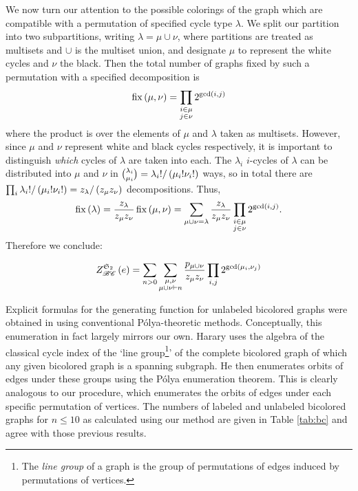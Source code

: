 \documentclass[sectionflow,singlespace,twoside,boldmathhdr,draft]{brandiss} %
\numberwithin{section}{chapter}
\numberwithin{figure}{chapter}
\begin{document}
We now turn our attention to the possible colorings of the graph which are compatible with a permutation of specified cycle type $\lambda$.
We split our partition into two subpartitions, writing $\lambda = \mu \cup \nu$, where partitions are treated as multisets and $\cup$ is the multiset union, and designate $\mu$ to represent the white cycles and $\nu$ the black.
Then the total number of graphs fixed by such a permutation with a specified decomposition is
\begin{equation*}
  \operatorname{fix} \left( {\mu, \nu} \right) = \prod_{\substack{i \in \mu \\ j \in \nu}} 2^{\gcd \left( {i, j} \right)}
\end{equation*}
where the product is over the elements of $\mu$ and $\lambda$ taken as multisets.
However, since $\mu$ and $\nu$ represent white and black cycles respectively, it is important to distinguish \emph{which} cycles of $\lambda$ are taken into each.
The $\lambda_{i}$ $i$-cycles of $\lambda$ can be distributed into $\mu$ and $\nu$ in $\binom{\lambda_{i}}{\mu_{i}} = \lambda_{i}! / \left( {\mu_{i}! \nu_{i}!} \right)$ ways, so in total there are $\prod_{i} \lambda_{i}! / \left( {\mu_{i}! \nu_{i}!} \right) = z_{\lambda} / \left( {z_{\mu} z_{\nu}} \right)$ decompositions.
Thus,
\begin{equation*}
  \operatorname{fix} \left( {\lambda} \right) = \frac{z_{\lambda}}{z_{\mu} z_{\nu}} \operatorname{fix} \left( {\mu, \nu} \right) = \sum_{\mu \cup \nu = \lambda} \frac{z_{\lambda}}{z_{\mu} z_{\nu}} \prod_{\substack{i \in \mu \\ j \in \nu}} 2^{\gcd \left( {i, j} \right)}.
\end{equation*}
Therefore we conclude:
\begin{theorem}
  \begin{equation}
    \label{eq:ecibc}
    \gci{\symgp{2}}{\specname{BC}} \pbrac{e} = \sum_{n > 0} \sum_{\substack{\mu, \nu \\ \mu \cup \nu \vdash n}} \frac{p_{\mu \cup \nu}}{z_{\mu} z_{\nu}} \prod_{i, j} 2^{\gcd \pbrac{\mu_{i}, \nu_{j}}}
  \end{equation}
\end{theorem}

Explicit formulas for the generating function for unlabeled bicolored graphs were obtained in \cite{har:bicolored} using conventional P\'{o}lya-theoretic methods.
Conceptually, this enumeration in fact largely mirrors our own.
Harary uses the algebra of the classical cycle index of the `line group\footnote{The \emph{line group} of a graph is the group of permutations of edges induced by permutations of vertices.}' of the complete bicolored graph of which any given bicolored graph is a spanning subgraph.
He then enumerates orbits of edges under these groups using the P\'{o}lya enumeration theorem.
This is clearly analogous to our procedure, which enumerates the orbits of edges under each specific permutation of vertices.
The numbers of labeled and unlabeled bicolored graphs for $n \leq 10$ as calculated using our method are given in Table \ref{tab:bc} and agree with those previous results.
\end{document}
